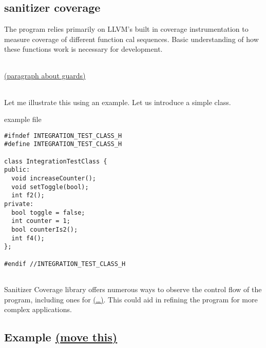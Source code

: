 \documentclass{elteikthesis}[2018/06/06]
\begin{document}
\subsection{sanitizer coverage}
\label{sec-3-2-2}
The program relies primarily on LLVM's built in coverage instrumentation to measure coverage of different function cal sequences. Basic understanding of how these functions work is necessary for development. \\


\begin{center}
\begin{tabular}{}
\\
\\
\end{tabular}
\end{center}
\uline{(paragraph about guards)} \\
\begin{center}
\begin{tabular}{}
\\
\\
\\
\end{tabular}
\end{center}

Let me illustrate this using an example. Let us introduce a simple class. \\
\begin{listing}
\caption{example file}
\begin{verbatim}
#ifndef INTEGRATION_TEST_CLASS_H
#define INTEGRATION_TEST_CLASS_H

class IntegrationTestClass {
public:
  void increaseCounter();
  void setToggle(bool);
  int f2();
private:
  bool toggle = false;
  int counter = 1;
  bool counterIs2();
  int f4();
};

#endif //INTEGRATION_TEST_CLASS_H
\end{verbatim}
\end{listing}
\begin{center}
\begin{tabular}{}
\\
\\
\end{tabular}
\end{center}

Sanitizer Coverage library offers numerous ways to observe the control flow of the program, including ones for \uline{(\ldots{})}. This could aid in refining the program for more complex applications. \\
\subsection{Example \underline{(move this)}}
\label{sec-3-2-3}
\end{document}
